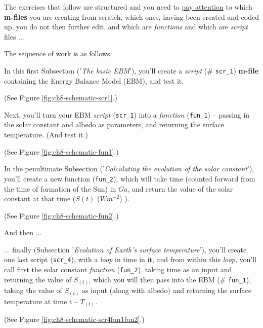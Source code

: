 \documentclass{tufte-book} %
\begin{document}
The exercises that follow are structured and you need to \uline{pay attention} to which \textbf{m-files} you are creating from scratch, which ones, having been created and coded up, you  do not then further edit, and which are \textit{functions} and which are \textit{script} files ... 

The sequence of work is as follows:

\begin{description}[align=right]

\setlength{\itemindent}{-0.2in}

\item [2.1.1] In this first Subsection ('\textit{The basic EBM}'), you'll  create a \textit{script} (\# \texttt{scr\_1}) \textbf{m-file} containing the Energy Balance Model (EBM), and test it.

\noindent (See Figure \ref{fig:ch8-schematic-scr1}.)

\item [2.1.2] Next, you'll turn your EBM \textit{script} (\texttt{scr\_1}) into a \textit{function} (\texttt{fun\_1}) -- passing in the solar constant and albedo as parameters, and returning the surface temperature. (And test it.)

\noindent (See Figure \ref{fig:ch8-schematic-fun1}.)

\item [2.1.3] In the penultimate Subsection ('\textit{Calculating the evolution of the solar constant}'), you'll create a new function (\texttt{fun\_2}), which will take time (counted forward from the time of formation of the Sun) in \(Ga\), and return the value of the solar constant at that time (\(S(t)\) (\(Wm^{-2}\)) ).

\noindent (See Figure \ref{fig:ch8-schematic-fun2}.)

\end{description}

\noindent And then ...

\begin{description}[align=right]

\setlength{\itemindent}{-0.2in}

\item [2.1.4] ... finally (Subsection '\textit{Evolution of Earth's surface temperature}'), you'll create one last script (\texttt{scr\_4}), with a \textit{loop} in time in it, and from within this \textit{loop}, you'll call first the solar constant \textit{function} (\texttt{fun\_2}), taking time as an input and returning the value of \(S_{(t)}\), which you will then pass into the EBM (\# \texttt{fun\_1}),  taking  the value of \(S_{(t)}\) as input (along with albedo) and returning the surface temperature at time t --  \(T_{(t)}\).

\noindent (See Figure \ref{fig:ch8-schematic-scr4fun1fun2}.)

\end{description}
\end{document}
